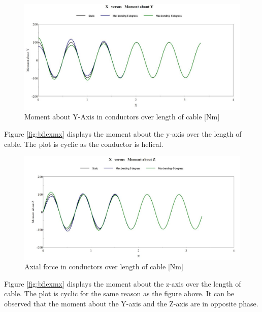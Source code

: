 \begin{figure}[H]
\centering
\includegraphics[scale=0.75]{figures/bflexmy}
\caption[$\; \:$Moment about Y-Axis in conductors]{Moment about Y-Axis in conductors over length of cable [Nm]}
 \label{fig:bflexmy}
\end{figure}
\noindent Figure \ref{fig:bflexmx} displays the moment about the y-axis over the length of cable. The plot is cyclic as the conductor is helical. 

\begin{figure}[H]
\centering
\includegraphics[scale=0.75]{figures/bflexmz}
\caption[$\; \:$Axial force in conductors]{Axial force in conductors over length of cable [Nm]}
 \label{fig:bflexmz}
\end{figure}
\noindent Figure \ref{fig:bflexmx} displays the moment about the z-axis over the length of cable. The plot is cyclic for the same reason as the figure above. It can be observed that the moment about the Y-axis and the Z-axis are in opposite phase.  

